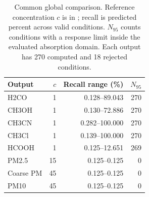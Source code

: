 \begin{table}[t]
\centering\scriptsize
\caption{Common global comparison. Reference concentration $c$ is in \ugm; recall is predicted percent across valid conditions. $N_{95}$ counts conditions with a response limit inside the evaluated absorption domain. Each output has 270 computed and 18 rejected conditions.}
\label{tab:global-all}
\begin{tabular}{lrrr}\toprule
Output & $c$ & Recall range (\%) & $N_{95}$\\\midrule
H2CO & 1 & 0.128--89.043 & 270 \\
CH3OH & 1 & 0.130--72.886 & 270 \\
CH3CN & 1 & 0.282--100.000 & 270 \\
CH3Cl & 1 & 0.139--100.000 & 270 \\
HCOOH & 1 & 0.125--12.651 & 269 \\
PM2.5 & 15 & 0.125--0.125 & 0 \\
Coarse PM & 45 & 0.125--0.125 & 0 \\
PM10 & 45 & 0.125--0.125 & 0 \\
\bottomrule\end{tabular}
\end{table}
